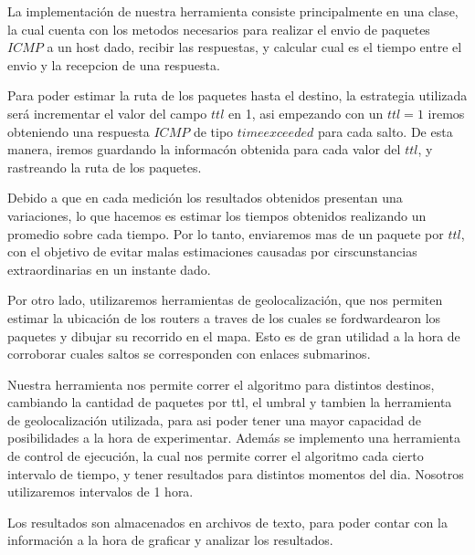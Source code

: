 La implementaci\'on de nuestra herramienta consiste principalmente en una clase, la cual cuenta con los metodos necesarios para realizar el envio de paquetes $ICMP$ a un host dado, recibir las respuestas, y calcular cual es el tiempo entre el envio y la recepcion de una respuesta. 

Para poder estimar la ruta de los paquetes hasta el destino, la estrategia utilizada ser\'a incrementar el valor del campo $ttl$ en 1, asi empezando con un $ttl = 1$ iremos obteniendo una respuesta $ICMP$ de tipo $time exceeded$ para cada salto. De esta manera, iremos guardando la informac\'on obtenida para cada valor del $ttl$, y rastreando la ruta de los paquetes.

Debido a que en cada medici\'on los resultados obtenidos presentan una variaciones, lo que hacemos es estimar los tiempos obtenidos realizando un promedio sobre cada tiempo. Por lo tanto, enviaremos mas de un paquete por $ttl$, con el objetivo de evitar malas estimaciones causadas por cirscunstancias extraordinarias en un instante dado.

Por otro lado, utilizaremos herramientas de geolocalizaci\'on, que nos permiten estimar la ubicaci\'on de los routers a traves de los cuales se fordwardearon los paquetes y dibujar su recorrido en el mapa. Esto es de gran utilidad a la hora de corroborar cuales saltos se corresponden con enlaces submarinos.

Nuestra herramienta nos permite correr el algoritmo para distintos destinos, cambiando la cantidad de paquetes por ttl, el umbral y tambien la herramienta de geolocalizaci\'on utilizada, para asi poder tener una mayor capacidad de posibilidades a la hora de experimentar.
Adem\'as se implemento una herramienta de control de ejecuci\'on, la cual nos permite correr el algoritmo cada cierto intervalo de tiempo, y tener resultados para distintos momentos del dia. Nosotros utilizaremos intervalos de 1 hora.


Los resultados son almacenados en archivos de texto, para poder contar con la informaci\'on a la hora de graficar y analizar los resultados.
